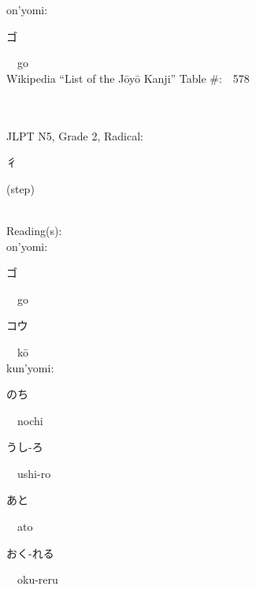 \begin{multicols}{2}
{\hspace*{1em}}on'yomi:\ \ \\
{\hspace*{2em}}{\begin{CJK}{UTF8}{min} ゴ \end{CJK}}\ \ go\ \ \\
Wikipedia ``List of the J\=oy\=o Kanji'' Table \#:\ \ 578 \\
\ \ \\
{\fontsize{34pt}{40pt}  }\ \ \\  %
{JLPT N5, Grade 2, Radical:\ \ {\begin{CJK}{UTF8}{min} 彳 \end{CJK}} (step) } \\
Reading(s):\ \ \\
{\hspace*{1em}}on'yomi:\ \ \\
{\hspace*{2em}}{\begin{CJK}{UTF8}{min} ゴ \end{CJK}}\ \ go\ \ \\
{\hspace*{2em}}{\begin{CJK}{UTF8}{min} コウ \end{CJK}}\ \ k\=o\ \ \\
{\hspace*{1em}}kun'yomi:\ \ \\
{\hspace*{2em}}{\begin{CJK}{UTF8}{min} のち \end{CJK}}\ \ nochi\ \ \\
{\hspace*{2em}}{\begin{CJK}{UTF8}{min} うし-ろ \end{CJK}}\ \ ushi-ro\ \ \\
{\hspace*{2em}}{\begin{CJK}{UTF8}{min} あと \end{CJK}}\ \ ato\ \ \\
{\hspace*{2em}}{\begin{CJK}{UTF8}{min} おく-れる \end{CJK}}\ \ oku-reru\ \ \\

\end{multicols}
